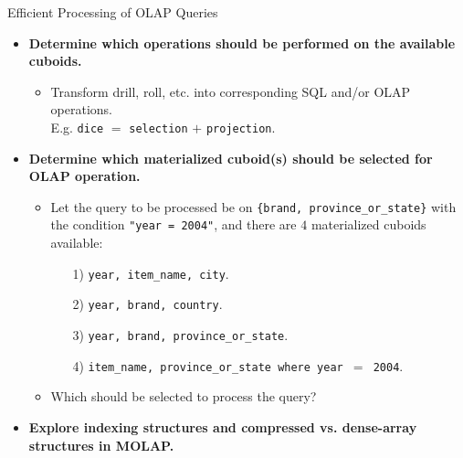 \begin{frame}{Efficient Processing of OLAP Queries}
	\begin{itemize}
		\item \textbf{Determine which operations should be performed on the available cuboids.}
		      \begin{itemize}
			      \item Transform drill, roll, etc. into corresponding SQL and/or OLAP operations.\\
			            E.g. \texttt{dice} $=$ \texttt{selection} $+$ \texttt{projection}.
		      \end{itemize}
		\item \textbf{Determine which materialized cuboid(s) should be selected for OLAP operation.}
		      \begin{itemize}
			      \item Let the query to be processed be on \texttt{\{brand, province\_or\_state\}} with the condition \texttt{"year = 2004"}, and there are $4$ materialized cuboids available:
			            \begin{itemize}
				            \item[1)] \texttt{{year, item\_name, city}}.
				            \item[2)] \texttt{{year, brand, country}}.
				            \item[3)] \texttt{{year, brand, province\_or\_state}}.
				            \item[4)] \texttt{{item\_name, province\_or\_state} where year $=$ 2004}.
			            \end{itemize}
			      \item Which should be selected to process the query?
		      \end{itemize}
		\item \textbf{Explore indexing structures and compressed vs. dense-array structures in MOLAP.}
	\end{itemize}
\end{frame}

